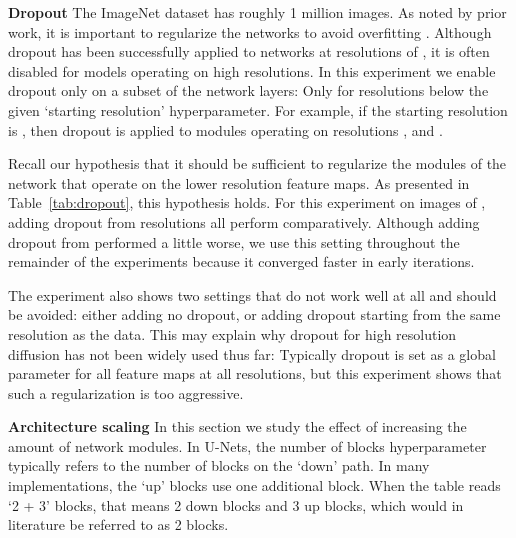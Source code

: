\documentclass[nohyperref]{article}
\theoremstyle{plain}
\theoremstyle{definition}
\theoremstyle{remark}
\begin{document}
\begin{table}
    \centering
    \caption{Dropout Ablation on ImageNet 128}\vspace{-.2cm}
    \label{tab:dropout}
\end{table}

\textbf{Dropout}
The ImageNet dataset has roughly 1 million images. As noted by prior work, it is important to regularize the networks to avoid overfitting \citep{ho2022cascaded,dhariwal2021diffusionbeatgans}. Although dropout has been successfully applied to networks at resolutions of , it is often disabled for models operating on high resolutions. In this experiment we enable dropout only on a subset of the network layers: Only for resolutions below the given `starting resolution' hyperparameter. For example, if the starting resolution is , then dropout is applied to modules operating on resolutions ,  and .


Recall our hypothesis that it should be sufficient to regularize the modules of the network that operate on the lower resolution feature maps. As presented in Table~\ref{tab:dropout}, this hypothesis holds. For this experiment on images of , adding dropout from resolutions  all perform comparatively. Although adding dropout from  performed a little worse, we use this setting throughout the remainder of the experiments because it converged faster in early iterations.


The experiment also shows two settings that do not work well at all and should be avoided: either adding no dropout, or adding dropout starting from the same resolution as the data. This may explain why dropout for high resolution diffusion has not been widely used thus far: Typically dropout is set as a global parameter for all feature maps at all resolutions, but this experiment shows that such a regularization is too aggressive.

\textbf{Architecture scaling}
In this section we study the effect of increasing the amount of  network modules. In U-Nets, the number of blocks hyperparameter typically refers to the number of blocks on the `down' path. In many implementations, the `up' blocks use one additional block. When the table reads `2 + 3' blocks, that means 2 down blocks and 3 up blocks, which would in literature be referred to as 2 blocks.
\end{document}
